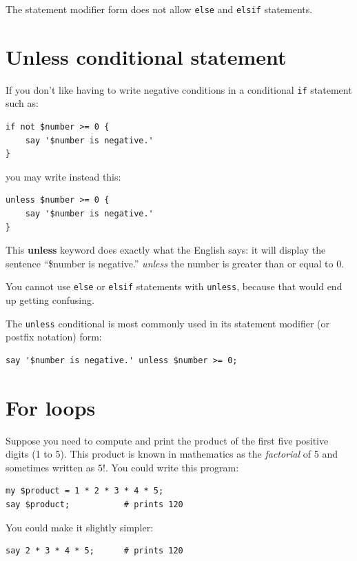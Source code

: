 The statement modifier form does not allow {\tt else} and
{\tt elsif} statements.

\section{Unless conditional statement}

If you don't like having to write negative conditions in a conditional
{\tt if} statement such as:
%
\begin{verbatim}
if not $number >= 0 {
    say '$number is negative.' 
}
\end{verbatim}
%

you may write instead this:
\begin{verbatim}
unless $number >= 0 {
    say '$number is negative.' 
}
\end{verbatim}
%
This {\bf unless} keyword does exactly what the English says: 
it will display the sentence ``\$number is negative.'' 
\emph{unless} the number is greater than or equal to 0.

You cannot use {\tt else} or {\tt elsif} statements with 
{\tt unless}, because that would end up getting confusing.

The {\tt unless} conditional is most commonly used in its statement modifier (or postfix notation) form:

 
 

\begin{verbatim}
say '$number is negative.' unless $number >= 0;
\end{verbatim}
%

\section{For loops}
\label{for_loops}

Suppose you need to compute and print the product of the first 
five positive digits (1 to 5). This product is known in mathematics 
as the \emph{factorial} of 5 and sometimes written as $5!$. You could write this program:

\begin{verbatim}
my $product = 1 * 2 * 3 * 4 * 5;
say $product;           # prints 120
\end{verbatim}
%

You could make it slightly simpler:
\begin{verbatim}
say 2 * 3 * 4 * 5;      # prints 120
\end{verbatim}
%

